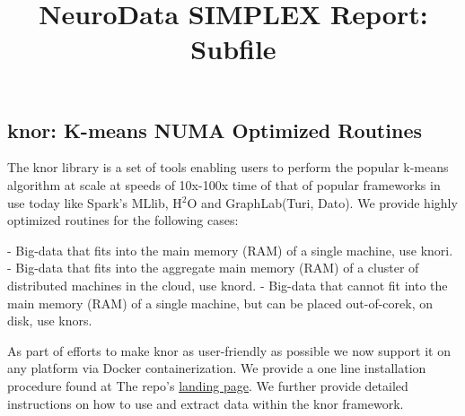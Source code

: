 \documentclass[simplex.tex]{subfiles}
\title{NeuroData SIMPLEX Report: Subfile}
\begin{document}

\subsection{knor: K-means NUMA Optimized Routines}

The \textsf{knor} library is a set of tools enabling users to perform the
popular k-means algorithm at scale at speeds of 10x-100x time of that of popular
frameworks in use today like Spark's MLlib, H$^2$O and GraphLab(Turi, Dato).
We provide highly optimized routines for the
following cases:

- Big-data that fits into the main memory (RAM) of a single machine, use
        \textsf{knori}. \newline
- Big-data that fits into the aggregate main memory (RAM) of a cluster
        of distributed machines in the cloud, use \textsf{knord}. \newline
- Big-data that cannot fit into the main memory (RAM) of a single machine,
        but can be placed out-of-corek, on disk, use \textsf{knors}.

As part of efforts to make \textsf{knor} as user-friendly as possible we now
support it on any platform via Docker containerization. We provide a one line
installation procedure found at The repo's
\href{https://github.com/disa-mhembere/knor/}{landing page}.
We further provide detailed instructions on how to use and extract data within
the \textsf{knor} framework.
\end{document}
